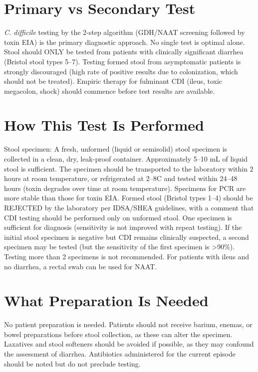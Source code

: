 \section*{Primary vs Secondary Test}
\textit{C. difficile} testing by the 2-step algorithm (GDH/NAAT screening followed by toxin EIA) is the primary diagnostic approach. No single test is optimal alone. Stool should ONLY be tested from patients with clinically significant diarrhea (Bristol stool types 5--7). Testing formed stool from asymptomatic patients is strongly discouraged (high rate of positive results due to colonization, which should not be treated). Empiric therapy for fulminant CDI (ileus, toxic megacolon, shock) should commence before test results are available.

\section*{How This Test Is Performed}
Stool specimen: A fresh, unformed (liquid or semisolid) stool specimen is collected in a clean, dry, leak-proof container. Approximately 5--10 mL of liquid stool is sufficient. The specimen should be transported to the laboratory within 2 hours at room temperature, or refrigerated at 2--8\textdegree{}C and tested within 24--48 hours (toxin degrades over time at room temperature). Specimens for PCR are more stable than those for toxin EIA. Formed stool (Bristol types 1--4) should be REJECTED by the laboratory per IDSA/SHEA guidelines, with a comment that CDI testing should be performed only on unformed stool. One specimen is sufficient for diagnosis (sensitivity is not improved with repeat testing). If the initial stool specimen is negative but CDI remains clinically suspected, a second specimen may be tested (but the sensitivity of the first specimen is >90\%). Testing more than 2 specimens is not recommended. For patients with ileus and no diarrhea, a rectal swab can be used for NAAT.

\section*{What Preparation Is Needed}
No patient preparation is needed. Patients should not receive barium, enemas, or bowel preparations before stool collection, as these can alter the specimen. Laxatives and stool softeners should be avoided if possible, as they may confound the assessment of diarrhea. Antibiotics administered for the current episode should be noted but do not preclude testing.

